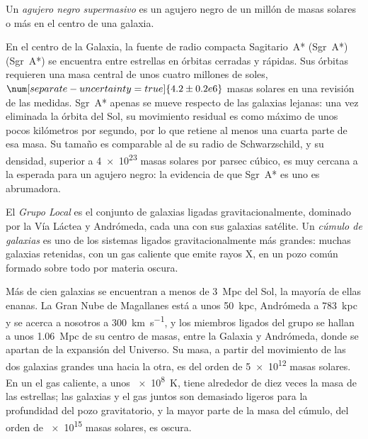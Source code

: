 \begin{definition}\label{def:b3:milky-way-galaxies:smbh}
Un \emph{agujero negro supermasivo} es un agujero
negro de un millón de masas solares o más en el centro de una galaxia.
\end{definition}

En el centro de la Galaxia, la fuente de radio compacta Sagitario~A* (Sgr~A*)
(Sgr~A*) se encuentra entre estrellas en órbitas cerradas y rápidas. Sus órbitas requieren una
masa central de unos cuatro millones de soles, $\num[separate-uncertainty=true]{4.2 \pm 0.2 e6}$
masas solares en una revisión de las medidas. Sgr~A* apenas se mueve
respecto de las galaxias lejanas: una vez eliminada la órbita del Sol,
su movimiento residual es como máximo de unos pocos kilómetros por segundo, por lo que
retiene al menos una cuarta parte de esa masa. Su tamaño es comparable al de su radio
de Schwarzschild, y su densidad, superior a \num{4e23} masas solares por
parsec cúbico, es muy cercana a la esperada para un agujero negro: la evidencia
de que Sgr~A* es uno es abrumadora.

\begin{definition}\label{def:b3:milky-way-galaxies:groups}
El \emph{Grupo Local} es el conjunto de galaxias ligadas
gravitacionalmente, dominado por la Vía Láctea y Andrómeda, cada una con
sus galaxias satélite. Un \emph{cúmulo de galaxias} es
uno de los sistemas ligados gravitacionalmente más grandes: muchas galaxias retenidas,
con un gas caliente que emite rayos X, en un pozo común formado sobre todo por
materia oscura.
\end{definition}

Más de cien galaxias se encuentran a menos de \qty{3}{Mpc} del Sol, la mayoría
de ellas enanas. La Gran Nube de Magallanes está a unos \qty{50}{kpc}, Andrómeda a
\qty{783}{kpc} y se acerca a nosotros a \qty{300}{km.s^{-1}}, y los miembros
ligados del grupo se hallan a unos \qty{1.06}{Mpc} de su centro de
masas, entre la Galaxia y Andrómeda, donde se apartan de la
expansión del Universo. Su masa, a partir del movimiento de las dos galaxias grandes
una hacia la otra, es del orden de \num{5e12} masas solares. En un
 el gas caliente, a unos \qty{e8}{K}, tiene alrededor de diez
veces la masa de las estrellas; las galaxias y el gas juntos son demasiado ligeros para
la profundidad del pozo gravitatorio, y la mayor parte de la masa del cúmulo,
del orden de \num{e15} masas solares, es oscura.

